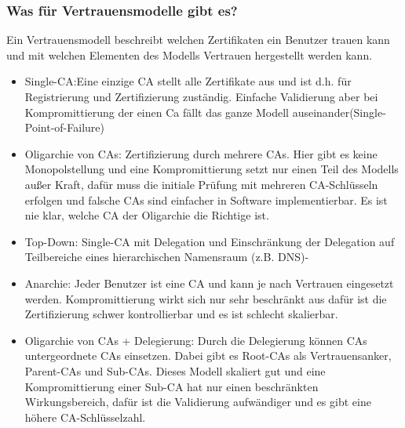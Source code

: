 	\subsubsection{Was für Vertrauensmodelle gibt es?}
	Ein Vertrauensmodell beschreibt welchen Zertifikaten ein Benutzer trauen kann und mit welchen Elementen des Modells Vertrauen hergestellt werden kann.
	\begin{itemize}
		\item Single-CA:Eine einzige CA stellt alle Zertifikate aus und ist d.h. für Registrierung und Zertifizierung zuständig. Einfache Validierung aber bei Kompromittierung der einen Ca fällt das ganze Modell auseinander(Single-Point-of-Failure)
		\item Oligarchie von CAs: Zertifizierung durch mehrere CAs. Hier gibt es keine Monopolstellung und eine Kompromittierung setzt nur einen Teil des Modells außer Kraft, dafür muss die initiale Prüfung mit mehreren CA-Schlüsseln erfolgen und falsche CAs sind einfacher in Software implementierbar. Es ist nie klar, welche CA der Oligarchie die Richtige ist.
		\item Top-Down: Single-CA mit Delegation und Einschränkung der Delegation auf Teilbereiche eines hierarchischen Namensraum (z.B. DNS)-
		\item Anarchie: Jeder Benutzer ist eine CA und kann je nach Vertrauen eingesetzt werden. Kompromittierung wirkt sich nur sehr beschränkt aus dafür ist die Zertifizierung schwer kontrollierbar und es ist schlecht skalierbar.
		\item Oligarchie von CAs + Delegierung: Durch die Delegierung können CAs untergeordnete CAs einsetzen. Dabei gibt es Root-CAs als Vertrauensanker, Parent-CAs und Sub-CAs. Dieses Modell skaliert gut und eine Kompromittierung einer Sub-CA hat nur einen beschränkten Wirkungsbereich, dafür ist die Validierung aufwändiger und es gibt eine höhere CA-Schlüsselzahl.
	\end{itemize}
	
